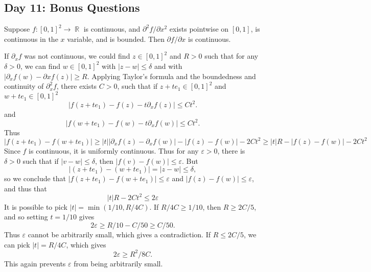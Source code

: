 \documentclass[answers]{exam}
\DeclareMathOperator{\RR}{\mathbb{R}}
\theoremstyle{problemstyle}
\newcommand{\1}[1]{\textbf{1}_{\left[#1\right]}} %
\begin{document}
\begin{questions}
\newpage
\section{Day 11: Bonus Questions}

\question Suppose $f: [0,1]^2 \to \RR$ is continuous, and $\partial^2 f / \partial x^2$ exists pointwise on $[0,1]$, is continuous in the $x$ variable, and is bounded. Then $\partial f / \partial x$ is continuous.
\begin{solution}
	If $\partial_x f$ was not continuous, we could find $z \in [0,1]^2$ and $R > 0$ such that for any $\delta > 0$, we can find $w \in [0,1]^2$ with $|z - w| \leq \delta$ and with $| \partial_x f(w) - \partial x f(z)| \geq R$. Applying Taylor's formula and the boundedness and continuity of $\partial_x^2 f$, there exists $C > 0$, such that if $z + te_1 \in [0,1]^2$ and $w + te_1 \in [0,1]^2$
	\[ |f(z + t e_1) - f(z) - t \partial_x f(z)| \leq C t^2. \]
	and
	\[ |f(w + te_1) - f(w) - t \partial_x f(w)| \leq C t^2. \]
	Thus
	\[ |f(z + t e_1) - f(w + te_1)| \geq |t| |\partial_x f(z) - \partial_x f(w)| - |f(z) - f(w)| - 2Ct^2 \geq |t| R - |f(z) - f(w)| - 2Ct^2 \]
	Since $f$ is continuous, it is uniformly continuous. Thus for any $\varepsilon > 0$, there is $\delta > 0$ such that if $|v - w| \leq \delta$, then $|f(v) - f(w)| \leq \varepsilon$. But
	\[ |(z + te_1) - (w + te_1)| = |z - w| \leq \delta, \]
	so we conclude that $|f(z + te_1) - f(w + te_1)| \leq \varepsilon$ and $|f(z) - f(w)| \leq \varepsilon$, and thus that
	\[ |t| R - 2Ct^2 \leq 2 \varepsilon \]
	It is possible to pick $|t| = \min(1/10, R/4C)$. If $R/4C \geq 1/10$, then $R \geq 2C/5$, and so setting $t = 1/10$ gives
	\[ 2 \varepsilon \geq R/10 - C/50 \geq C/50. \]
	Thus $\varepsilon$ cannot be arbitrarily small, which gives a contradiction. If $R \leq 2C/5$, we can pick $|t| = R/4C$, which gives
	\[ 2 \varepsilon \geq R^2/8C. \]
	This again prevents $\varepsilon$ from being arbitrarily small.
\end{solution}


\end{questions}
\end{document}
